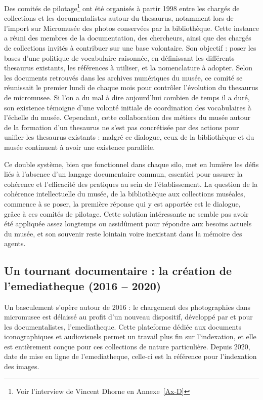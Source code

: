Des comités de pilotage\footnote{Voir l'interview de Vincent Dhorne en Annexe~\ref{Ax-D}} ont été organisés à partir 1998 entre les chargés de collections et les documentalistes autour du \gls{thesaurus}, notamment lors de l'import sur Micromusée des photos conservées par la bibliothèque. Cette instance a réuni des membres de la documentation, des chercheurs, ainsi que des chargés de collections invités à contribuer sur une base volontaire. Son objectif : poser les bases d'une politique de vocabulaire raisonnée, en définissant les différents \gls{thesaurus} existants, les références à utiliser, et la nomenclature à adopter. Selon les documents retrouvés dans les archives numériques du musée, ce comité se réunissait le premier lundi de chaque mois pour contrôler l'évolution du \gls{thesaurus} de \gls{micromusee}. Si l'on a du mal à dire aujourd'hui combien de temps il a duré, son existence témoigne d'une volonté initiale de coordination des vocabulaires à l'échelle du musée. Cependant, cette collaboration des métiers du musée autour de la formation d'un \gls{thesaurus} ne s'est pas concrétisée par des actions pour unifier les \gls{thesaurus} existants : malgré ce dialogue, ceux de la bibliothèque et du musée continuent à avoir une existence parallèle.

Ce double système, bien que fonctionnel dans chaque silo, met en lumière les défis liés à l'absence d'un langage documentaire commun, essentiel pour assurer la cohérence et l'efficacité des pratiques au sein de l'établissement. La question de la cohérence intellectuelle du musée, de la bibliothèque aux collections muséales, commence à se poser, la première réponse qui y est apportée est le dialogue, grâce à ces comités de pilotage. Cette solution intéressante ne semble pas avoir été appliquée assez longtemps ou assidûment pour répondre aux besoins actuels du musée, et son souvenir reste lointain voire inexistant dans la mémoire des agents.

\subsection{Un tournant documentaire : la création de l'\gls{emediatheque} (2016 – 2020)}

Un basculement s'opère autour de 2016 : le chargement des photographies dans \gls{micromusee} est délaissé au profit d'un nouveau dispositif, développé par et pour les documentalistes, l'\gls{emediatheque}. Cette plateforme dédiée aux documents iconographiques et audiovisuels permet un travail plus fin sur l'indexation, et elle est entièrement conçue pour ces collections de nature particulière. Depuis 2020, date de mise en ligne de l'\gls{emediatheque}, celle-ci est la référence pour l'indexation des images.

